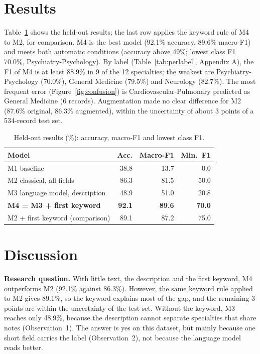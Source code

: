 \documentclass[twocolumn,10pt]{article}
\begin{document}
\section{Results}
\label{sec:results}

Table~\ref{tab:results} shows the held-out results; the last row applies the keyword rule of M4 to M2, for comparison. M4 is the best model (92.1\% accuracy, 89.6\% macro-F1) and meets both automatic conditions (accuracy above 49\%; lowest class F1 70.0\%, Psychiatry-Psychology). By label (Table~\ref{tab:perlabel}, Appendix A), the F1 of M4 is at least 88.9\% in 9 of the 12 specialties; the weakest are Psychiatry-Psychology (70.0\%), General Medicine (79.5\%) and Neurology (82.7\%). The most frequent error (Figure~\ref{fig:confusion}) is Cardiovascular-Pulmonary predicted as General Medicine (6 records). Augmentation made no clear difference for M2 (87.6\% original, 86.3\% augmented), within the uncertainty of about 3 points of a 534-record test set.

\begin{table}[!ht]
\centering
\caption{Held-out results (\%): accuracy, macro-F1 and lowest class F1.}
\label{tab:results}
\footnotesize
\setlength{\tabcolsep}{4pt}
\begin{tabular}{@{}lrrr@{}}
\toprule
Model & Acc. & Macro-F1 & Min.\ F1 \\
\midrule
M1 baseline & 38.8 & 13.7 & 0.0 \\
M2 classical, all fields & 86.3 & 81.5 & 50.0 \\
M3 language model, description & 48.9 & 51.0 & 20.8 \\
\textbf{M4 = M3 + first keyword} & \textbf{92.1} & \textbf{89.6} & \textbf{70.0} \\
\midrule
M2 + first keyword (comparison) & 89.1 & 87.2 & 75.0 \\
\bottomrule
\end{tabular}
\end{table}

\section{Discussion}
\label{sec:discussion}

\textbf{Research question.} With little text, the description and the first keyword, M4 outperforms M2 (92.1\% against 86.3\%). However, the same keyword rule applied to M2 gives 89.1\%, so the keyword explains most of the gap, and the remaining 3 points are within the uncertainty of the test set. Without the keyword, M3 reaches only 48.9\%, because the description cannot separate specialties that share notes (Observation~1). The answer is yes on this dataset, but mainly because one short field carries the label (Observation~2), not because the language model reads better.
\end{document}
